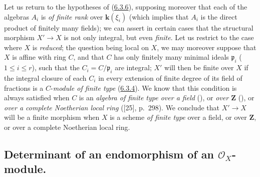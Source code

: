 \begin{remark}[6.3.10]
\label{II.6.3.10}
Let us return to the hypotheses of (\hyperref[II.6.3.6]{6.3.6}),
supposing moreover that each of the algebras $A_i$ is \emph{of finite rank}
over $\boldsymbol{k}(\xi_i)$ (which implies that $A_i$ is the direct product of finitely
many fields); we can assert in certain cases that the structural morphism
$X'\to X$ is not only integral, but even \emph{finite}. Let us restrict to
the case where $X$ is \emph{reduced}; the question being local on $X$, we may
moreover suppose that $X$ is affine with ring $C$, and that $C$ has only
finitely many minimal ideals $\mathfrak{p}_i$ ($1\leq i\leq r$), such that
the $C_i=C/\mathfrak{p}_i$ are integral; $X'$ will then be finite over $X$ if
the integral closure of each $C_i$ in every extension of finite degree of its
field of fractions is a $C$-\emph{module of finite type}
(\hyperref[II.6.3.4]{6.3.4}). We know that this condition is always
satisfied when $C$ is an \emph{algebra of finite type over a field}
(\cite[vol.~I, p.~267, Theorem~9]{I-13}), or \emph{over $\mathbf{Z}$}
(\cite[vol.~I, p.~93, Theorem~3]{I-9}), or \emph{over a complete Noetherian
local ring} ([25], p.~298). We conclude that $X'\to X$ will be a finite
morphism when $X$ is a scheme \emph{of finite type} over a field, or over
$\mathbf{Z}$, or over a complete Noetherian local ring.
\end{remark}

\subsection{Determinant of an endomorphism of an $\mathcal{O}_X$-module.}
\label{subsection:II.6.4}

